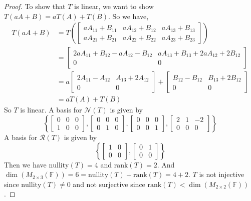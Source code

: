 \documentclass[leqno]{article}
\theoremstyle{nonumberplain}
\newtheorem{proof}{Proof}
\begin{document}
\begin{proof}
To show that $T$ is linear, we want to show $T(aA+B)=aT(A)+T(B)$.  So we have,
\begin{align*}
T(aA+B)&=T\left(
\begin{bmatrix}
aA_{11}+B_{11} & aA_{12}+B_{12} & aA_{13}+B_{13}\\
aA_{21}+B_{21} & aA_{22}+B_{22} & aA_{23}+B_{23}
\end{bmatrix}
\right)\\
&=
\begin{bmatrix}
2aA_{11}+B_{12}-aA_{12}-B_{12} & aA_{13}+B_{13}+2aA_{12}+2B_{12}\\
0 & 0
\end{bmatrix}\\
&=a
\begin{bmatrix}
2A_{11}-A_{12} & A_{13}+2A_{12}\\
0 & 0
\end{bmatrix}+
\begin{bmatrix}
B_{12}-B_{12} & B_{13}+2B_{12}\\
0 & 0
\end{bmatrix}\\
&=aT(A)+T(B)
\end{align*}
So $T$ is linear.  A basis for $\mathcal{N}(T)$ is given by \[\left\{
\begin{bmatrix}
0 & 0 & 0\\
1 & 0 & 0
\end{bmatrix},
\begin{bmatrix}
0 & 0 & 0\\
0 & 1 & 0
\end{bmatrix},
\begin{bmatrix}
0 & 0 & 0\\
0 & 0 & 1
\end{bmatrix},
\begin{bmatrix}
2 & 1 & -2\\
0 & 0 & 0
\end{bmatrix}
\right\}
\]
A basis for $\mathcal{R}(T)$ is given by
\[\left\{
\begin{bmatrix}
1 & 0\\
0 & 0
\end{bmatrix},
\begin{bmatrix}
0 & 1\\
0 & 0
\end{bmatrix}
\right\}
\]
Then we have $\textrm{nullity}(T)=4$ and $\textrm{rank}(T)=2$.  And $\dim(M_{2\times 3}(\mathbb{F}))=6=\textrm{nullity}(T)+\textrm{rank}(T)=4+2$.  $T$ is not injective since $\textrm{nullity}(T)\neq 0$ and not surjective since $\textrm{rank}(T)<\dim(M_{2\times 2}(\mathbb{F}))$.
\end{proof}
\end{document}

